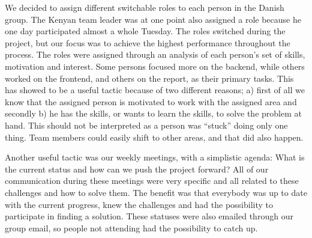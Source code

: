 We decided to assign different switchable roles to each person in the Danish group. The Kenyan team leader was at one point also assigned a role because he one day participated almost a whole Tuesday. The roles switched during the project, but our focus was to achieve the highest performance throughout the process. The roles were assigned through an analysis of each person's set of skills, motivation and interest. Some persons focused more on the backend, while others worked on the frontend, and others on the report, as their primary tasks. This has showed to be a useful tactic because of two different reasons; a) first of all we know that the assigned person is motivated to work with the assigned area and secondly b) he has the skills, or wants to learn the skills, to solve the problem at hand. This should not be interpreted as a person was ``stuck'' doing only one thing. Team members could easily shift to other areas, and that did also happen.

Another useful tactic was our weekly meetings, with a simplistic agenda: What is the current status and how can we push the project forward? All of our communication during these meetings were very specific and all related to these challenges and how to solve them. The benefit was that everybody was up to date with the current progress, knew the challenges and had the possibility to participate in finding a solution. These statuses were also emailed through our group email, so people not attending had the possibility to catch up.
